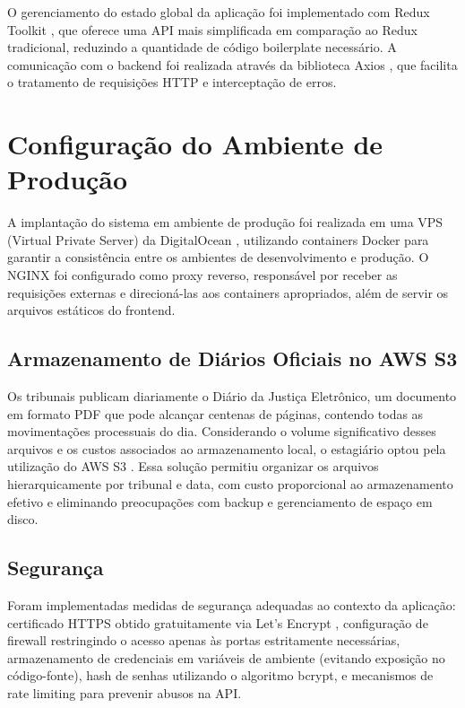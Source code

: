 \documentclass[
	12pt,
	oneside,
	a4paper,
	brazil,
	sumario=tradicional
]{abntex2}
\begin{document}
O gerenciamento do estado global da aplicação foi implementado com Redux Toolkit \cite{redux_docs}, que oferece uma API mais simplificada em comparação ao Redux tradicional, reduzindo a quantidade de código boilerplate necessário. A comunicação com o backend foi realizada através da biblioteca Axios \cite{axios_docs}, que facilita o tratamento de requisições HTTP e interceptação de erros.

\section{Configuração do Ambiente de Produção}

A implantação do sistema em ambiente de produção foi realizada em uma VPS (Virtual Private Server) da DigitalOcean \cite{digitalocean_docs}, utilizando containers Docker \cite{docker_docs} para garantir a consistência entre os ambientes de desenvolvimento e produção. O NGINX \cite{nginx_docs} foi configurado como proxy reverso, responsável por receber as requisições externas e direcioná-las aos containers apropriados, além de servir os arquivos estáticos do frontend.

\subsection{Armazenamento de Diários Oficiais no AWS S3}

Os tribunais publicam diariamente o Diário da Justiça Eletrônico, um documento em formato PDF que pode alcançar centenas de páginas, contendo todas as movimentações processuais do dia. Considerando o volume significativo desses arquivos e os custos associados ao armazenamento local, o estagiário optou pela utilização do AWS S3 \cite{aws_s3_docs}. Essa solução permitiu organizar os arquivos hierarquicamente por tribunal e data, com custo proporcional ao armazenamento efetivo e eliminando preocupações com backup e gerenciamento de espaço em disco.

\subsection{Segurança}

Foram implementadas medidas de segurança adequadas ao contexto da aplicação: certificado HTTPS obtido gratuitamente via Let's Encrypt \cite{letsencrypt_docs}, configuração de firewall restringindo o acesso apenas às portas estritamente necessárias, armazenamento de credenciais em variáveis de ambiente (evitando exposição no código-fonte), hash de senhas utilizando o algoritmo bcrypt, e mecanismos de rate limiting para prevenir abusos na API.
\end{document}
